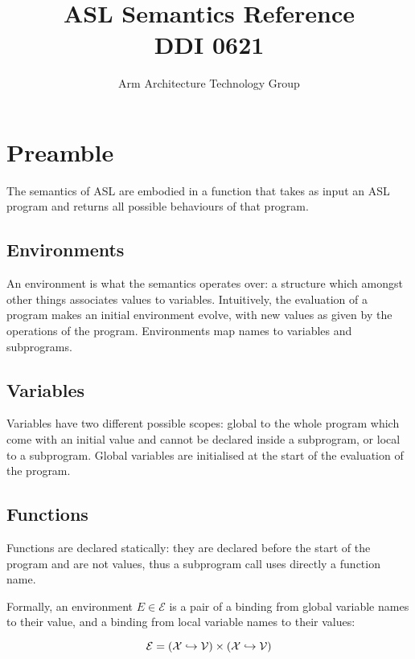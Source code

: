 \documentclass{book}
\author{Arm Architecture Technology Group}
\title{ASL Semantics Reference \\
       DDI 0621}
\begin{document}
\maketitle

\tableofcontents{}





\chapter{Preamble}

The semantics of ASL are embodied in a function that takes as input an ASL program
and returns all possible behaviours of that program.

\section{Environments}

An environment is what the semantics operates over: a structure
which amongst other things associates values to variables.
Intuitively, the evaluation of a program makes an initial
environment evolve, with new values as given by the operations
of the program. Environments map names to variables and subprograms.

\section{Variables}
Variables have two different possible scopes: global to the whole program which
come with an initial value and cannot be declared inside a subprogram, or local
to a subprogram. Global variables are initialised at the start of the evaluation
of the program.

\section{Functions}
Functions are declared statically: they are declared before the start of the
program and are not values, thus a subprogram call uses directly a function name.

Formally, an environment $E \in \mathcal{E}$ is a pair of a binding from global
variable names to their value, and a binding from local variable names to their
values:

%
\[
  \mathcal{E} = \left( \mathcal{X} \hookrightarrow \mathcal{V} \right)
         \times \left( \mathcal{X} \hookrightarrow \mathcal{V} \right)
\]
\end{document}
